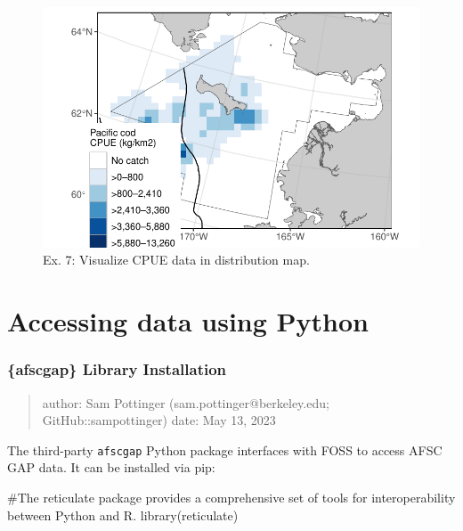 \documentclass[
  letterpaper,
  oneside,
  open=any]{scrbook}
\newenvironment{Shaded}{\begin{snugshade}}{\end{snugshade}}
\newcommand{\CommentTok}[1]{\textcolor[rgb]{0.37,0.37,0.37}{#1}}
\newcommand{\FunctionTok}[1]{\textcolor[rgb]{0.28,0.35,0.67}{#1}}
\newcommand{\NormalTok}[1]{\textcolor[rgb]{0.00,0.23,0.31}{#1}}
\begin{document}
\begin{figure}[H]

{\centering \includegraphics{content/foss-api-r_files/figure-pdf/test-7-fig-1.pdf}

}

\caption{Ex. 7: Visualize CPUE data in distribution map.}

\end{figure}

\hypertarget{accessing-data-using-python}{%
\chapter{Accessing data using
Python}\label{accessing-data-using-python}}

\hypertarget{afscgap-library-installation}{%
\subsection{\{afscgap\} Library
Installation}\label{afscgap-library-installation}}

\begin{quote}
author: Sam Pottinger (sam.pottinger@berkeley.edu; GitHub::sampottinger)
date: May 13, 2023
\end{quote}

The third-party \texttt{afscgap} Python package interfaces with FOSS to
access AFSC GAP data. It can be installed via pip:

\begin{Shaded}
\begin{Highlighting}[]
\CommentTok{\#The reticulate package provides a comprehensive set of tools for interoperability between Python and R. }
\FunctionTok{library}\NormalTok{(reticulate)}
\end{Highlighting}
\end{Shaded}
\end{document}
